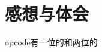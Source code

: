 \documentclass[UTF8,a4paper,10pt]{ctexart}
\begin{document}
\section{感想与体会}
opcode有一位的和两位的



















































\end{document}

